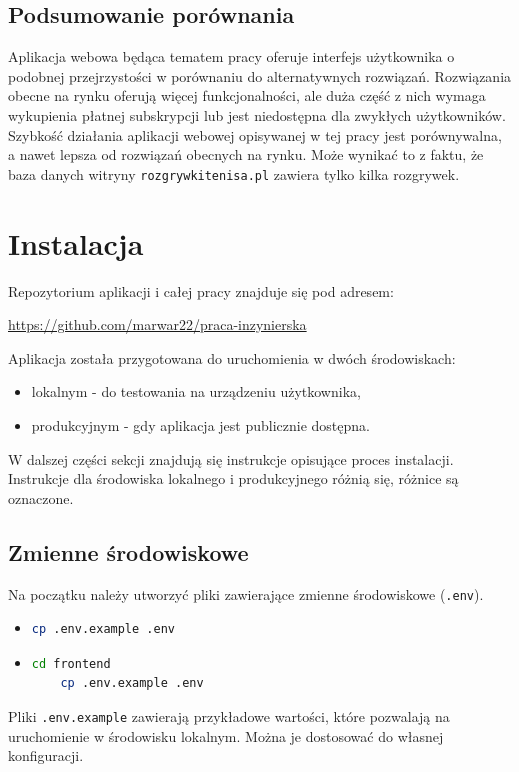 \documentclass[shortabstract]{iithesis}
\begin{document}
\subsection{Podsumowanie porównania}
Aplikacja webowa będąca tematem pracy oferuje interfejs użytkownika o podobnej przejrzystości w porównaniu do alternatywnych rozwiązań.
Rozwiązania obecne na rynku oferują więcej funkcjonalności, ale duża część z nich wymaga wykupienia płatnej subskrypcji lub jest niedostępna dla zwykłych użytkowników.
Szybkość działania aplikacji webowej opisywanej w tej pracy jest porównywalna, a nawet lepsza od rozwiązań obecnych na rynku.
Może wynikać to z faktu, że baza danych witryny \texttt{rozgrywkitenisa.pl} zawiera tylko kilka rozgrywek.

\section{Instalacja}
\noindent
Repozytorium aplikacji i całej pracy znajduje się pod adresem:
\begin{center}
    \url{https://github.com/marwar22/praca-inzynierska}
\end{center}
\noindent
Aplikacja została przygotowana do uruchomienia w dwóch środowiskach:
\begin{itemize}
    \item lokalnym - do testowania na urządzeniu użytkownika,
    \item produkcyjnym - gdy aplikacja jest publicznie dostępna.
\end{itemize}
W dalszej części sekcji znajdują się instrukcje opisujące proces instalacji.
Instrukcje dla środowiska lokalnego i produkcyjnego różnią się, różnice są oznaczone.
\subsection{Zmienne środowiskowe}
\noindent
Na początku należy utworzyć pliki zawierające zmienne środowiskowe (\texttt{.env}).

\begin{itemize}
    \item
          \begin{lstlisting}[language=bash]
    cp .env.example .env
    \end{lstlisting}

    \item
          \begin{lstlisting}[language=bash]
    cd frontend
    cp .env.example .env
    \end{lstlisting}
\end{itemize}
Pliki \texttt{.env.example} zawierają przykładowe wartości, które pozwalają na uruchomienie w środowisku lokalnym.
Można je dostosować do własnej konfiguracji.
\end{document}
